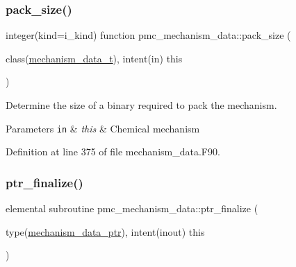 \mbox{\label{namespacepmc__mechanism__data_a3b72bf41eb5c1c7f0e9d93f00dc837ae}} 
\subsubsection{\texorpdfstring{pack\+\_\+size()}{pack\_size()}}
{\footnotesize\ttfamily integer(kind=i\+\_\+kind) function pmc\+\_\+mechanism\+\_\+data\+::pack\+\_\+size (\begin{DoxyParamCaption}\item[{class(\mbox{\hyperlink{structpmc__mechanism__data_1_1mechanism__data__t}{mechanism\+\_\+data\+\_\+t}}), intent(in)}]{this }\end{DoxyParamCaption})\hspace{0.3cm}{\ttfamily [private]}}



Determine the size of a binary required to pack the mechanism. 


\begin{DoxyParams}[1]{Parameters}
\mbox{\tt in}  & {\em this} & Chemical mechanism \\
\hline
\end{DoxyParams}


Definition at line 375 of file mechanism\+\_\+data.\+F90.

\mbox{\label{namespacepmc__mechanism__data_ad03843746b59d1b24473475c733a9571}} 
\subsubsection{\texorpdfstring{ptr\+\_\+finalize()}{ptr\_finalize()}}
{\footnotesize\ttfamily elemental subroutine pmc\+\_\+mechanism\+\_\+data\+::ptr\+\_\+finalize (\begin{DoxyParamCaption}\item[{type(\mbox{\hyperlink{structpmc__mechanism__data_1_1mechanism__data__ptr}{mechanism\+\_\+data\+\_\+ptr}}), intent(inout)}]{this }\end{DoxyParamCaption})\hspace{0.3cm}{\ttfamily [private]}}



